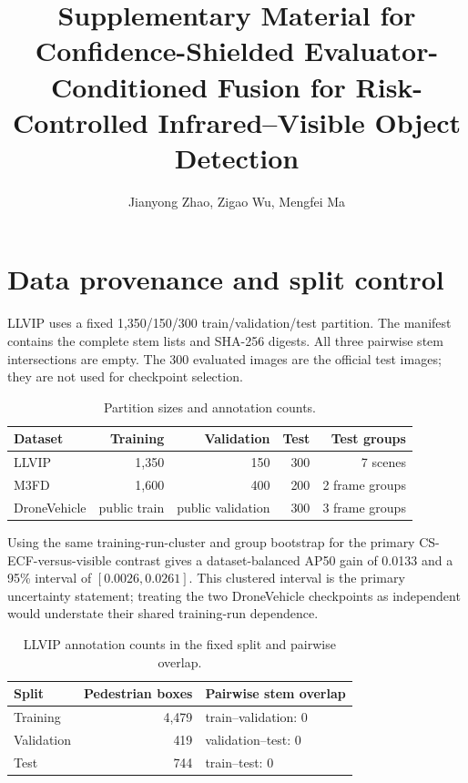 \documentclass[11pt]{article}
\title{Supplementary Material for\\Confidence-Shielded
Evaluator-Conditioned Fusion for Risk-Controlled Infrared--Visible Object
Detection}
\author{Jianyong Zhao, Zigao Wu, Mengfei Ma}
\date{}
\begin{document}
\maketitle
\sloppy

\section{Data provenance and split control}

LLVIP uses a fixed 1,350/150/300 train/validation/test partition. The manifest
contains the complete stem lists and SHA-256 digests. All three pairwise stem
intersections are empty. The 300 evaluated images are the official test images;
they are not used for checkpoint selection.

\begin{table}[h]
\centering
\small
\caption{Partition sizes and annotation counts.}
\begin{tabular}{@{}lrrrr@{}}
\toprule
Dataset & Training & Validation & Test & Test groups \\
\midrule
LLVIP & 1,350 & 150 & 300 & 7 scenes \\
M3FD & 1,600 & 400 & 200 & 2 frame groups \\
DroneVehicle & public train & public validation & 300 & 3 frame groups \\
\bottomrule
\end{tabular}
\end{table}

Using the same training-run-cluster and group bootstrap for the primary
CS-ECF-versus-visible contrast gives a dataset-balanced AP50 gain of 0.0133 and
a 95\% interval of \([0.0026,0.0261]\). This clustered interval is the primary
uncertainty statement; treating the two DroneVehicle checkpoints as independent
would understate their shared training-run dependence.

\begin{table}[h]
\centering
\small
\caption{LLVIP annotation counts in the fixed split and pairwise overlap.}
\begin{tabular}{@{}lrl@{}}
\toprule
Split & Pedestrian boxes & Pairwise stem overlap \\
\midrule
Training & 4,479 & train--validation: 0 \\
Validation & 419 & validation--test: 0 \\
Test & 744 & train--test: 0 \\
\bottomrule
\end{tabular}
\end{table}
\end{document}
